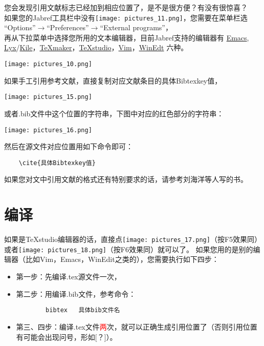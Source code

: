 \documentclass[cn,geye,cyan,normal,14pt]{elegantnote}
\begin{document}
您会发现引用文献标志已经加到相应位置了，是不是很方便？有没有很惊喜？\\
如果您的Jabref工具栏中没有\texttt{[image: pictures\_11.png]}，您需要在菜单栏选\\
``Options''$\to$``Preferences''$\to$``External programs''，\\
再从下拉菜单中选择您所用的文本编辑器，目前Jabref支持的编辑器有 \href{https://ftp.gnu.org/gnu/emacs/}{Emacs}, \href{https://www.lyx.org/}{Lyx}/\href{https://kile.sourceforge.io/}{Kile}，\href{https://www.xm1math.net/texmaker/}{\TeX maker}，\href{https://github.com/texstudio-org/texstudio/releases}{\TeX studio}，\href{https://github.com/vim/vim/releases}{Vim}，\href{http://www.winedt.com/}{WinEdt} 六种。
			\begin{center}
			\texttt{[image: pictures\_10.png]}
			\end{center}
\begin{note}
	如果手工引用参考文献，直接复制对应文献条目的具体Bibtexkey值，
			\begin{center}
			\texttt{[image: pictures\_15.png]}
			\end{center}
			或者.bib文件中这个位置的字符串，下图中对应的红色部分的字符串：
			\begin{center}
			\texttt{[image: pictures\_16.png]}
			\end{center}
	然后在源文件对应位置用如下命令即可：
	\begin{lstlisting}
	\cite{具体Bibtexkey值}
	\end{lstlisting}
\end{note}
\begin{note}
	如果您对文中引用文献的格式还有特别要求的话，请参考刘海洋等人写的书\cite{胡伟2013LATEX,刘海洋2013LATEX,陈志杰2006LATEX}。
\end{note}
\section{编译}
如果是\TeX studio编辑器的话，直接点\texttt{[image: pictures\_17.png]}（按F5效果同）或者\texttt{[image: pictures\_18.png]}（按F6效果同）就可以了。
如果您用的是别的编辑器（比如Vim，Emacs，WinEdit之类的），您需要执行如下四步\cite[第 380 页]{胡伟2013LATEX}：
\begin{itemize}
	\item 第一步：先编译.tex源文件一次，
	\item 第二步：用\BibTeX 编译.bib文件，参考命令：
		\begin{lstlisting}
		bibtex   具体bib文件名
		\end{lstlisting}
	\item 第三、四步：编译.tex文件\textcolor{red}{两}次，就可以正确生成引用位置了（否则引用位置有可能会出现问号，形如[？]）。
\end{itemize}
\end{document}
